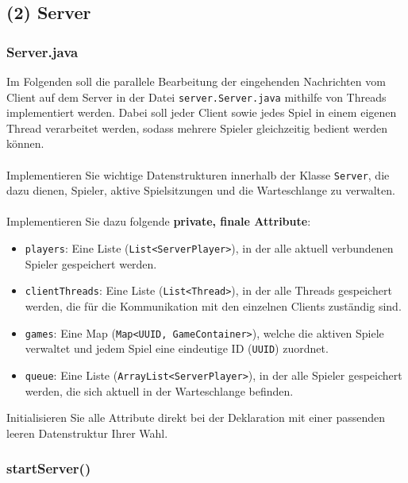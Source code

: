 \documentclass[12pt]{article}
\begin{document}
\vspace{0.5cm}

\subsection*{(2) Server}

\subsubsection*{Server.java}

Im Folgenden soll die parallele Bearbeitung der eingehenden Nachrichten vom Client auf dem Server 
in der Datei \texttt{server.Server.java} mithilfe von Threads implementiert werden. 
Dabei soll jeder Client sowie jedes Spiel in einem eigenen Thread verarbeitet werden, 
sodass mehrere Spieler gleichzeitig bedient werden können.
\\ \\
Implementieren Sie wichtige Datenstrukturen innerhalb der Klasse \texttt{Server}, 
die dazu dienen, Spieler, aktive Spielsitzungen und die Warteschlange zu verwalten.
\\ \\
Implementieren Sie dazu folgende \textbf{private, finale Attribute}:

\begin{itemize}
    \item \texttt{players}: Eine Liste (\texttt{List<ServerPlayer>}), in der alle aktuell verbundenen Spieler gespeichert werden.
    \item \texttt{clientThreads}: Eine Liste (\texttt{List<Thread>}), in der alle Threads gespeichert werden, 
    die für die Kommunikation mit den einzelnen Clients zuständig sind.
    \item \texttt{games}: Eine Map (\texttt{Map<UUID, GameContainer>}), welche die aktiven Spiele verwaltet 
    und jedem Spiel eine eindeutige ID (\texttt{UUID}) zuordnet.
    \item \texttt{queue}: Eine Liste (\texttt{ArrayList<ServerPlayer>}), in der alle Spieler gespeichert werden, 
    die sich aktuell in der Warteschlange befinden.
\end{itemize}

Initialisieren Sie alle Attribute direkt bei der Deklaration mit einer passenden 
leeren Datenstruktur Ihrer Wahl.

\subsubsection*{startServer()}
\end{document}
